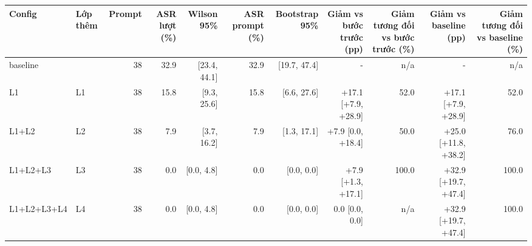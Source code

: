 \begin{tabular}{llrrrrrrrrr}
\toprule
Config & Lớp thêm & Prompt & ASR lượt (\%) & Wilson 95\% & ASR prompt (\%) & Bootstrap 95\% & Giảm vs bước trước (pp) & Giảm tương đối vs bước trước (\%) & Giảm vs baseline (pp) & Giảm tương đối vs baseline (\%) \\
\midrule
baseline &  & 38 & 32.9 & [23.4, 44.1] & 32.9 & [19.7, 47.4] & - & n/a & - & n/a \\
L1 & L1 & 38 & 15.8 & [9.3, 25.6] & 15.8 & [6.6, 27.6] & +17.1 [+7.9, +28.9] & 52.0 & +17.1 [+7.9, +28.9] & 52.0 \\
L1+L2 & L2 & 38 & 7.9 & [3.7, 16.2] & 7.9 & [1.3, 17.1] & +7.9 [0.0, +18.4] & 50.0 & +25.0 [+11.8, +38.2] & 76.0 \\
L1+L2+L3 & L3 & 38 & 0.0 & [0.0, 4.8] & 0.0 & [0.0, 0.0] & +7.9 [+1.3, +17.1] & 100.0 & +32.9 [+19.7, +47.4] & 100.0 \\
L1+L2+L3+L4 & L4 & 38 & 0.0 & [0.0, 4.8] & 0.0 & [0.0, 0.0] & 0.0 [0.0, 0.0] & n/a & +32.9 [+19.7, +47.4] & 100.0 \\
\bottomrule
\end{tabular}
